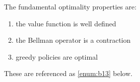 The fundamental optimality properties are:

\begin{enumerate}\label{enum:b13}
    \item[(B1)] the value function is well defined
    \item[(B2)] the Bellman operator is a contraction
    \item[(B3)] greedy policies are optimal
\end{enumerate}

These are referenced as \cref{enum:b13} below.
